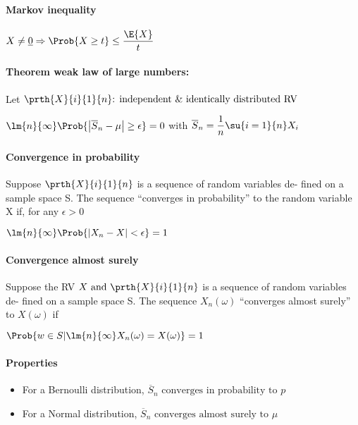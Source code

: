 \paragraph{Markov inequality}
\begin{center}
		$X\neq\underline{0}\Rightarrow \Prob{X\geq t}\leq \dfrac{\E{X}}{t}$
\end{center}
\paragraph{Theorem weak law of large numbers:}
Let $\prth{X}{i}{1}{n}\text{: independent \& identically distributed RV}$
\begin{center}
	$\lm{n}{\infty}\Prob{\left|\overline{S}_{n}-\mu\right|\geq\epsilon}=0$ with $\overline{S}_{n}=\dfrac{1}{n}\su{ {i=1}}{n}X_{i}$
\end{center}
\paragraph{Convergence in probability}
Suppose $\prth{X}{i}{1}{n}$ is a sequence of random variables de-
fined on a sample space S. The sequence ``converges in probability'' to the
random variable X if, for any $\epsilon>0$
\begin{center}
	$\lm{n}{\infty}\Prob{\left|X_{n}-X\right|<\epsilon}=1$
\end{center}
\paragraph{Convergence almost surely}
Suppose the RV $X\text{ and }\prth{X}{i}{1}{n}$ is a sequence of random variables de-
fined on a sample space S. The sequence $X_{n}(\omega)$ ``converges almost surely'' to $X(\omega)$ if
\begin{center}
	$\Prob{w\in S|\lm{n}{\infty}X_{n}(\omega)=X(\omega)}=1$
\end{center}
\paragraph{Properties}
\begin{itemize}
	\item For a Bernoulli distribution, $\overline{S}_{n}\text{ converges in probability to }p$
	\item For a Normal distribution, $\overline{S}_{n}\text{ converges almost surely to }\mu$
\end{itemize}
